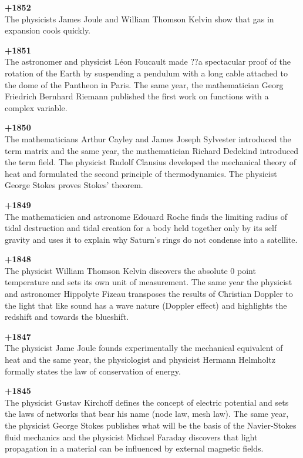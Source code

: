 \textbf{+1852}\\
The physicists James Joule and William Thomson Kelvin show that gas in expansion cools quickly.

\textbf{+1851}\\
The astronomer and physicist Léon Foucault made ??a spectacular proof of the rotation of the Earth by suspending a pendulum with a long cable attached to the dome of the Pantheon in Paris. The same year, the mathematician Georg Friedrich Bernhard Riemann published the first work on functions with a complex variable.

\textbf{+1850}\\
The mathematicians Arthur Cayley and James Joseph Sylvester introduced the term matrix and the same year, the mathematician Richard Dedekind introduced the term field. The physicist Rudolf Clausius developed the mechanical theory of heat and formulated the second principle of thermodynamics. The physicist George Stokes proves Stokes' theorem.

\textbf{+1849}\\
The mathematicien and astronome Edouard Roche finds the limiting radius of tidal destruction and tidal creation for a body held together only by its self gravity and uses it to explain why Saturn's rings do not condense into a satellite.

\textbf{+1848}\\
The physicist William Thomson Kelvin discovers the absolute 0 point temperature and sets its own unit of measurement. The same year the physicist and astronomer Hippolyte Fizeau transposes the results of Christian Doppler to the light that like sound has a wave nature (Doppler effect) and highlights the redshift and towards the blueshift.

\textbf{+1847}\\
The physicist Jame Joule founds experimentally the mechanical equivalent of heat and the same year, the physiologist and physicist Hermann Helmholtz formally states the law of conservation of energy.

\textbf{+1845}\\
The physicist Gustav Kirchoff defines the concept of electric potential and sets the laws of networks that bear his name (node law, mesh law). The same year, the physicist George Stokes publishes what will be the basis of the Navier-Stokes fluid mechanics and the physicist Michael Faraday discovers that light propagation in a material can be influenced by external magnetic fields.

